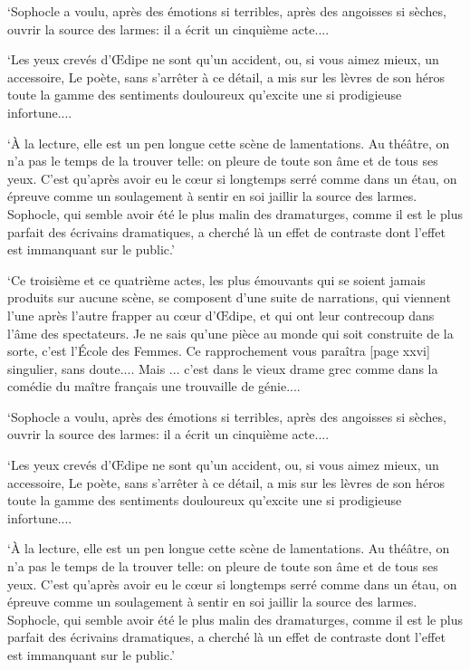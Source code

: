 \documentclass[11pt,letter]{book}
\begin{document}
\par  ‘Sophocle a voulu, après des émotions si terribles, après des angoisses si sèches, ouvrir la source des larmes: il a écrit un cinquième acte....

\par  ‘Les yeux crevés d’Œdipe ne sont qu’un accident, ou, si vous aimez mieux, un accessoire, Le poète, sans s’arrêter à ce détail, a mis sur les lèvres de son héros toute la gamme des sentiments douloureux qu’excite une si prodigieuse infortune....

\par  ‘À la lecture, elle est un pen longue cette scène de lamentations. Au théâtre, on n’a pas le temps de la trouver telle: on pleure de toute son âme et de tous ses yeux. C’est qu’après avoir eu le cœur si longtemps serré comme dans un étau, on épreuve comme un soulagement à sentir en soi jaillir la source des larmes. Sophocle, qui semble avoir été le plus malin des dramaturges, comme il est le plus parfait des écrivains dramatiques, a cherché là un effet de contraste dont l’effet est immanquant sur le public.’

\par  ‘Ce troisième et ce quatrième actes, les plus émouvants qui se soient jamais produits sur aucune scène, se composent d’une suite de narrations, qui viennent l’une après l’autre frapper au cœur d’Œdipe, et qui ont leur contrecoup dans l’âme des spectateurs. Je ne sais qu’une pièce au monde qui soit construite de la sorte, c’est l’École des Femmes. Ce rapprochement vous paraîtra [page xxvi] singulier, sans doute.... Mais ... c’est dans le vieux drame grec comme dans la comédie du maître français une trouvaille de génie....

\par  ‘Sophocle a voulu, après des émotions si terribles, après des angoisses si sèches, ouvrir la source des larmes: il a écrit un cinquième acte....

\par  ‘Les yeux crevés d’Œdipe ne sont qu’un accident, ou, si vous aimez mieux, un accessoire, Le poète, sans s’arrêter à ce détail, a mis sur les lèvres de son héros toute la gamme des sentiments douloureux qu’excite une si prodigieuse infortune....

\par  ‘À la lecture, elle est un pen longue cette scène de lamentations. Au théâtre, on n’a pas le temps de la trouver telle: on pleure de toute son âme et de tous ses yeux. C’est qu’après avoir eu le cœur si longtemps serré comme dans un étau, on épreuve comme un soulagement à sentir en soi jaillir la source des larmes. Sophocle, qui semble avoir été le plus malin des dramaturges, comme il est le plus parfait des écrivains dramatiques, a cherché là un effet de contraste dont l’effet est immanquant sur le public.’
\end{document}
